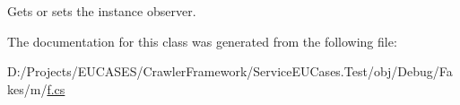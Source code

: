 Gets or sets the instance observer.



The documentation for this class was generated from the following file\-:\begin{DoxyCompactItemize}
\item 
D\-:/\-Projects/\-E\-U\-C\-A\-S\-E\-S/\-Crawler\-Framework/\-Service\-E\-U\-Cases.\-Test/obj/\-Debug/\-Fakes/m/\hyperlink{m_2f_8cs}{f.\-cs}\end{DoxyCompactItemize}
